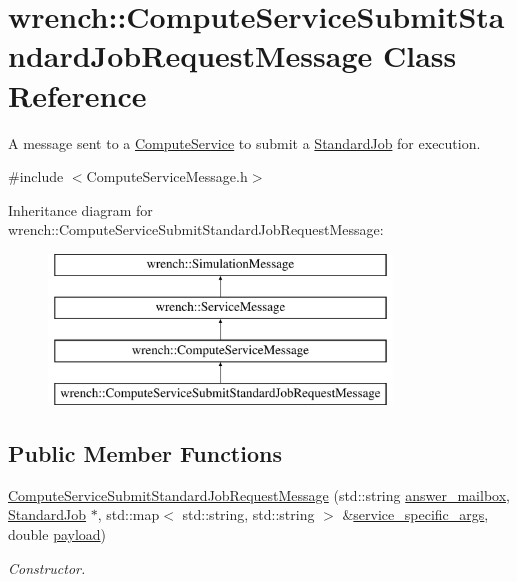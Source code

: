\hypertarget{classwrench_1_1_compute_service_submit_standard_job_request_message}{}\section{wrench\+:\+:Compute\+Service\+Submit\+Standard\+Job\+Request\+Message Class Reference}
\label{classwrench_1_1_compute_service_submit_standard_job_request_message}


A message sent to a \hyperlink{classwrench_1_1_compute_service}{Compute\+Service} to submit a \hyperlink{classwrench_1_1_standard_job}{Standard\+Job} for execution.  




{\ttfamily \#include $<$Compute\+Service\+Message.\+h$>$}

Inheritance diagram for wrench\+:\+:Compute\+Service\+Submit\+Standard\+Job\+Request\+Message\+:\begin{figure}[H]
\begin{center}
\leavevmode
\includegraphics[height=4.000000cm]{classwrench_1_1_compute_service_submit_standard_job_request_message}
\end{center}
\end{figure}
\subsection*{Public Member Functions}
\begin{DoxyCompactItemize}
\item 
\hyperlink{classwrench_1_1_compute_service_submit_standard_job_request_message_a4c1e0a38b7f99e33b388cec0c0dbc4ee}{Compute\+Service\+Submit\+Standard\+Job\+Request\+Message} (std\+::string \hyperlink{classwrench_1_1_compute_service_submit_standard_job_request_message_a685047fc639e623f1cdb06c4c418ec6d}{answer\+\_\+mailbox}, \hyperlink{classwrench_1_1_standard_job}{Standard\+Job} $\ast$, std\+::map$<$ std\+::string, std\+::string $>$ \&\hyperlink{classwrench_1_1_compute_service_submit_standard_job_request_message_a35f19a63653c0028c0a2da3cb94f8f17}{service\+\_\+specific\+\_\+args}, double \hyperlink{classwrench_1_1_simulation_message_a914f2732713f7c02898e66f05a7cb8a1}{payload})
\begin{DoxyCompactList}\small\item\em Constructor. \end{DoxyCompactList}\end{DoxyCompactItemize}
